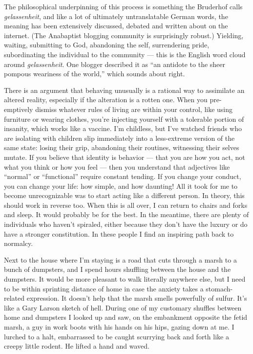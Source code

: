 The philosophical underpinning of this process is something the
Bruderhof calls \emph{gelassenheit}, and like a lot of ultimately
untranslatable German words, the meaning has been extensively discussed,
debated and written about on the internet. (The Anabaptist blogging
community is surprisingly robust.) Yielding, waiting, submitting to God,
abandoning the self, surrendering pride, subordinating the individual to
the community --- this is the English word cloud around
\emph{gelassenheit}. One blogger described it as ``an antidote to the
sheer pompous weariness of the world,'' which sounds about right.

There is an argument that behaving unusually is a rational way to
assimilate an altered reality, especially if the alteration is a rotten
one. When you pre-emptively dismiss whatever rules of living are within
your control, like using furniture or wearing clothes, you're injecting
yourself with a tolerable portion of insanity, which works like a
vaccine. I'm childless, but I've watched friends who are isolating with
children slip immediately into a less-extreme version of the same state:
losing their grip, abandoning their routines, witnessing their selves
mutate. If you believe that identity is behavior --- that you are how
you act, not what you think or how you feel --- then you understand that
adjectives like ``normal'' or ``functional'' require constant tending.
If you change your conduct, you can change your life: how simple, and
how daunting! All it took for me to become unrecognizable was to start
acting like a different person. In theory, this should work in reverse
too. When this is all over, I can return to chairs and forks and sleep.
It would probably be for the best. In the meantime, there are plenty of
individuals who haven't spiraled, either because they don't have the
luxury or do have a stronger constitution. In these people I find an
inspiring path back to normalcy.

Next to the house where I'm staying is a road that cuts through a marsh
to a bunch of dumpsters, and I spend hours shuffling between the house
and the dumpsters. It would be more pleasant to walk literally anywhere
else, but I need to be within sprinting distance of home in case the
anxiety takes a stomach-related expression. It doesn't help that the
marsh smells powerfully of sulfur. It's like a Gary Larson sketch of
hell. During one of my customary shuffles between home and dumpsters I
looked up and saw, on the embankment opposite the fetid marsh, a guy in
work boots with his hands on his hips, gazing down at me. I lurched to a
halt, embarrassed to be caught scurrying back and forth like a creepy
little rodent. He lifted a hand and waved.

